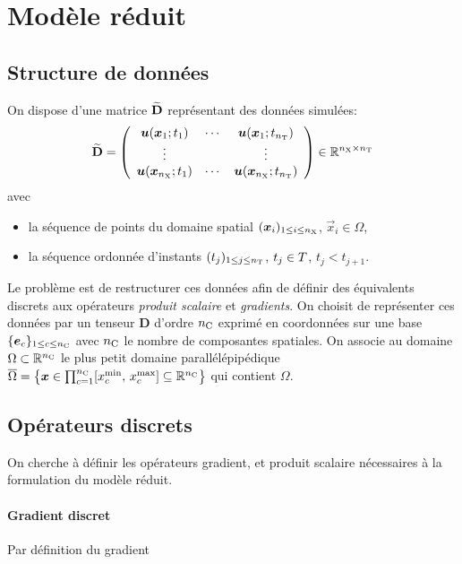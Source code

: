 \documentclass[11pt,a4paper]{article}
\newcommand{\nx}{{n_{\labelname{X}}}}
\newcommand{\nt}{{n_{\labelname t}}}
\renewcommand{\nt}{{n_{\labelname T}}}
\newcommand{\nc}{{n_{\labelname C}}}
\newcommand{\Dtens}{{\mathbf{D}}}
\begin{document}
\section{Modèle réduit}
%
\subsection{Structure de données}
%
On dispose d'une matrice $\widetilde{\mathbf{D}}$ représentant des données simulées:
\begin{equation}
\widetilde{\mat{D}} = \left( 
\begin{array}{ccc}
\vec{u}(\vec{x}_1; t_1)& \cdots & \vec{u}(\vec{x}_1; t_\nt) \\
\vdots & & \vdots\\
\vec{u}(\vec{x}_\nx; t_1)& \cdots & \vec{u}(\vec{x}_\nx; t_\nt) \\
\end{array}
\right) \in \RR^{\nx \times \nt}
\end{equation}
avec 
\begin{itemize}
\item la séquence de points du domaine spatial $(\vec x_i)_{1\leq i \leq \nx}$, $\vec x _i \in \Omega$,
\item la séquence ordonnée d'instants $(t_j)_{1\leq j \leq  \nt }$, $t_j\in T$, $t_j< t_{j+1}$.
\end{itemize}
%
Le problème est de restructurer ces données afin de définir des équivalents discrets aux opérateurs \emph{produit scalaire} et \emph{gradients}.
%
On choisit de représenter ces données par un tenseur $\Dtens$ d'ordre $\nc$ exprimé en coordonnées sur une base $\{\vec{e}_c\}_{1\leq c\leq \nc}$ avec $\nc$ le nombre de composantes spatiales.
%
On associe au domaine $\Omega\subset\RR^{\nc}$ le plus petit domaine parallélépipédique $\overline{\Omega} = \left\{\vec x \in \prod_{c=1}^\nc [x^{\labelname{min}}_c,\, x^{\labelname{max}}_c] \subseteq \RR^{\nc} \right\}$ qui contient $\Omega$.

\subsection{Opérateurs discrets}
%
On cherche à définir les opérateurs gradient, et produit scalaire nécessaires à la formulation du modèle réduit.
%
\paragraph{Gradient discret}
%
Par définition du gradient
\end{document}
